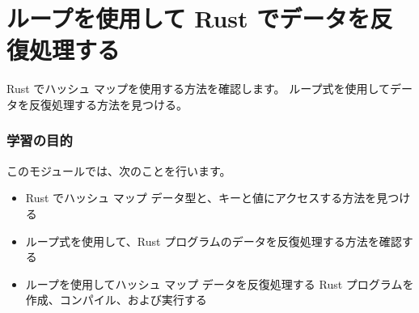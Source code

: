 \section{ループを使用して Rust でデータを反復処理する}

Rust でハッシュ マップを使用する方法を確認します。 ループ式を使用してデータを反復処理する方法を見つける。

\subsubsection{学習の目的}

このモジュールでは、次のことを行います。

\begin{itemize}
\item Rust でハッシュ マップ データ型と、キーと値にアクセスする方法を見つける
\item ループ式を使用して、Rust プログラムのデータを反復処理する方法を確認する
\item ループを使用してハッシュ マップ データを反復処理する Rust プログラムを作成、コンパイル、および実行する
\end{itemize}

